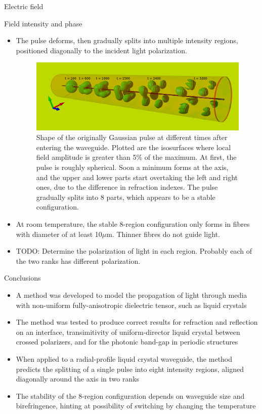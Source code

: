 \documentclass[8pt]{beamer}
\newlength{\wideitemsep}
\let\olditem\item
\renewcommand{\item}{\setlength{\itemsep}{\wideitemsep}\olditem}
\newcommand{\blockpadding}{
  \rule[-0.6ex]{0pt}{2.5ex}
}
\begin{document}
\begin{columns}[t]
\begin{column}{0.596\textwidth}
\begin{block}{\blockpadding Electric field}
\end{block}
\begin{block}{\blockpadding Field intensity and phase}
\begin{itemize}
\item The pulse deforms, then gradually splits into multiple intensity regions, positioned diagonally to the incident light polarization. 
\vspace{.3ex}
 \begin{figure}[h]
  \centering
  \includegraphics[width=.825\textwidth]{./intensity_gauss_t}
  \caption{Shape of the originally Gaussian pulse at different times after entering the waveguide. Plotted are the isosurfaces where local field amplitude is greater than 5\% of the maximum. At first, the pulse is roughly spherical. Soon a minimum forms at the axis, and the upper and lower parts start overtaking the left and right ones, due to the difference in refraction indexes. The pulse gradually splits into 8 parts, which appears to be a stable configuration. }
 \end{figure}

 \item At room temperature, the stable 8-region configuration only forms in fibres with diameter of at least 10$\mu$m. Thinner fibres do not guide light. 
 \item TODO: Determine the polarization of light in each region. Probably each of the two ranks has different polarization. 
\end{itemize}


\end{block}

\begin{block}{\blockpadding Conclusions}
 \begin{itemize}
  \item A method was developed to model the propagation of light through media with non-uniform fully-anisotropic dielectric tensor, such as liquid crystals
  \item The method was tested to produce correct results for refraction and reflection on an interface, transimitivity of uniform-director liquid crystal between crossed polarizers, and for the photonic band-gap in periodic structures
  \item When applied to a radial-profile liquid crystal waveguide, the method predicts the splitting of a single pulse into eight intensity regions, aligned diagonally around the axis in two ranks
  \item The stability of the 8-region configuration depends on waveguide size and birefringence, hinting at possibility of switching by changing the temperature
 \end{itemize}


\end{block}
\end{column}
\end{columns}
\end{document}
